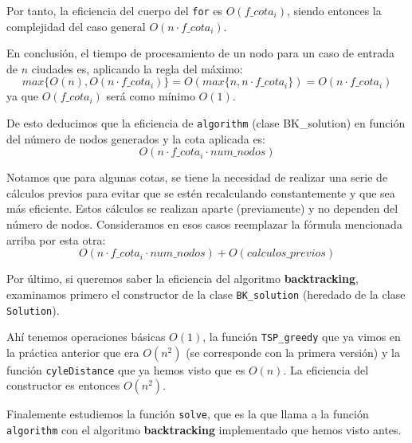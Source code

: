 \documentclass{article}
\begin{document}
Por tanto, la eficiencia del cuerpo del \texttt{for} es $O(f\_cota_i)$, siendo entonces la complejidad del caso general $O(n \cdot f\_cota_i)$.

En conclusión, el tiempo de procesamiento de un nodo para un caso de entrada de $n$ ciudades es, aplicando la regla del máximo: 
\begin{equation*}
    max\{O(n),O(n \cdot f\_cota_i)\} = O(max\{n,n \cdot f\_cota_i\}) = O(n \cdot f\_cota_i)
\end{equation*}
ya que $O(f\_cota_i)$ será como mínimo $O(1)$. 

De esto deducimos que la eficiencia de \verb|algorithm| (clase BK\_solution) en función del número de nodos generados y la cota aplicada es:
\begin{equation*}
    O(n \cdot f\_cota_i \cdot num\_nodos)
\end{equation*}

Notamos que para algunas cotas, se tiene la necesidad de realizar una serie de cálculos previos para evitar que se estén recalculando constantemente y que sea más eficiente. Estos cálculos se realizan aparte (previamente) y no dependen del número de nodos. Consideramos en esos casos reemplazar la fórmula mencionada arriba por esta otra:
\begin{equation*}
    O(n \cdot f\_cota_i \cdot num\_nodos) + O(calculos\_previos)
\end{equation*}

Por último, si queremos saber la eficiencia del algoritmo \textbf{backtracking}, examinamos primero el constructor de la clase \verb|BK_solution| (heredado de la clase \verb|Solution|).



Ahí tenemos operaciones básicas $O(1)$, la función \verb|TSP_greedy| que ya vimos en la práctica anterior que era $O(n^{2})$ (se corresponde con la primera versión) y la función \verb|cyleDistance| que ya hemos visto que es $O(n)$. La eficiencia del constructor es entonces $O(n^{2})$.

Finalemente estudiemos la función \verb|solve|, que es la que llama a la función \verb|algorithm| con el algoritmo \textbf{backtracking} implementado que hemos visto antes.



\end{document}

